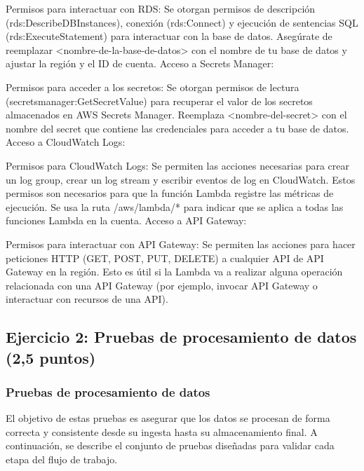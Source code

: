 \documentclass{article}
\begin{document}
Permisos para interactuar con RDS: Se otorgan permisos de descripción (rds:DescribeDBInstances), conexión (rds:Connect) y ejecución de sentencias SQL (rds:ExecuteStatement) para interactuar con la base de datos. Asegúrate de reemplazar <nombre-de-la-base-de-datos> con el nombre de tu base de datos y ajustar la región y el ID de cuenta.
Acceso a Secrets Manager:

Permisos para acceder a los secretos: Se otorgan permisos de lectura (secretsmanager:GetSecretValue) para recuperar el valor de los secretos almacenados en AWS Secrets Manager. Reemplaza <nombre-del-secret> con el nombre del secret que contiene las credenciales para acceder a tu base de datos.
Acceso a CloudWatch Logs:

Permisos para CloudWatch Logs: Se permiten las acciones necesarias para crear un log group, crear un log stream y escribir eventos de log en CloudWatch. Estos permisos son necesarios para que la función Lambda registre las métricas de ejecución. Se usa la ruta /aws/lambda/* para indicar que se aplica a todas las funciones Lambda en la cuenta.
Acceso a API Gateway:

Permisos para interactuar con API Gateway: Se permiten las acciones para hacer peticiones HTTP (GET, POST, PUT, DELETE) a cualquier API de API Gateway en la región. Esto es útil si la Lambda va a realizar alguna operación relacionada con una API Gateway (por ejemplo, invocar API Gateway o interactuar con recursos de una API).


\newpage
\subsection{Ejercicio 2: Pruebas de procesamiento de datos (2,5 puntos)}
\subsubsection{Pruebas de procesamiento de datos}

El objetivo de estas pruebas es asegurar que los datos se procesan de forma correcta y consistente desde su ingesta hasta su almacenamiento final. A continuación, se describe el conjunto de pruebas diseñadas para validar cada etapa del flujo de trabajo.
\end{document}
